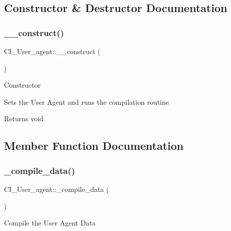 \subsection{Constructor \& Destructor Documentation}
\mbox{\label{class_c_i___user__agent_a855f58dba6facaba68b4ca266de0a264}} 
\subsubsection{\texorpdfstring{\+\_\+\+\_\+construct()}{\_\_construct()}}
{\footnotesize\ttfamily C\+I\+\_\+\+User\+\_\+agent\+::\+\_\+\+\_\+construct (\begin{DoxyParamCaption}{ }\end{DoxyParamCaption})}

Constructor

Sets the User Agent and runs the compilation routine

\begin{DoxyReturn}{Returns}
void 
\end{DoxyReturn}


\subsection{Member Function Documentation}
\mbox{\label{class_c_i___user__agent_a0ddc8e870077a0e9fa535b31fe8e91fb}} 
\subsubsection{\texorpdfstring{\+\_\+compile\+\_\+data()}{\_compile\_data()}}
{\footnotesize\ttfamily C\+I\+\_\+\+User\+\_\+agent\+::\+\_\+compile\+\_\+data (\begin{DoxyParamCaption}{ }\end{DoxyParamCaption})\hspace{0.3cm}{\ttfamily [protected]}}

Compile the User Agent Data


